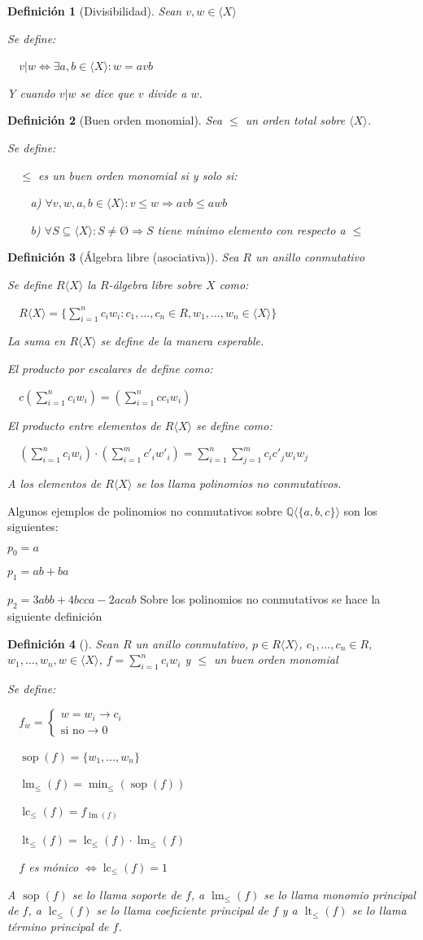 \documentclass{amsbook}
\theoremstyle{customstyle}
\newtheorem{definition}{Definición}[section]
\newcommand{\definición}[2][]{
  \begin{definition}[#1]
  \setlength{\parindent}{2em} %
  #2
  \end{definition}
}
\DeclareMathOperator{\sop}{sop}
\DeclareMathOperator{\lm}{lm}
\DeclareMathOperator{\lc}{lc}
\DeclareMathOperator{\lt}{lt}
\begin{document}
\definición[Divisibilidad] {
Sean $v, w ∈ ⟨X⟩$

Se define:

  $v | w ⇔ ∃a , b ∈ ⟨X⟩ : w = avb$

Y cuando $v | w$ se dice que $v$ divide a $w$.
}

\definición[Buen orden monomial] {
Sea $≤$ un orden total sobre $⟨X⟩$.

Se define:

  $≤$ es un buen orden monomial si y solo si:

    a) $∀v, w, a, b ∈ ⟨X⟩ : v ≤ w ⇒ avb ≤ awb$

    b) $∀S ⊆ ⟨X⟩ : S ≠ Ø ⇒ S$ tiene mínimo elemento con respecto a $≤$
}

\definición[Álgebra libre (asociativa)] {
Sea $R$ un anillo conmutativo

Se define $R⟨X⟩$ la $R$-álgebra libre sobre $X$ como:

  $R⟨X⟩ = \{\sum_{i = 1}^n c_i w_i : c_1, …, c_n ∈ R, w_1, …, w_n ∈ ⟨X⟩\}$

La suma en $R⟨X⟩$ se define de la manera esperable.

El producto por escalares de define como:

  $c (\sum_{i = 1}^n c_i w_i) = (\sum_{i = 1}^n c c_i w_i)$

El producto entre elementos de $R⟨X⟩$ se define como:

  $(\sum_{i = 1}^n c_i w_i) · (\sum_{i = 1}^m c'_i w'_i) = \sum_{i = 1}^n \sum_{j = 1}^m c_i c'_j w_i w_j$

A los elementos de $R⟨X⟩$ se los llama polinomios no conmutativos.
}

Algunos ejemplos de polinomios no conmutativos sobre $ℚ⟨\{a, b, c\}⟩$ son los siguientes:

$p_0 = a$

$p_1 = ab + ba$

$p_2 = 3 abb + 4 bcca - 2 acab$
Sobre los polinomios no conmutativos se hace la siguiente definición


\definición[] {
Sean $R$ un anillo conmutativo, $p ∈ R⟨X⟩$, $c_1, …, c_n ∈ R$, $w_1, …, w_n, w ∈ ⟨X⟩$, $f = \sum_{i = 1}^n c_i w_i$ y $≤$ un buen orden monomial

Se define:

  $f_w = \left\{\begin{array}{ll} w = w_i → c_i \\ \text{si no} → 0  \end{array} \right. $

  $\sop(f) = \{w_1, …, w_n\}$

  $\lm_≤(f) = \min_≤(\sop(f))$

  $\lc_≤(f) = f_{\lm(f)}$

  $\lt_≤(f) = \lc_≤(f) · \lm_≤(f)$

  $f$ es mónico $⇔ \lc_≤(f) = 1$

A $\sop(f)$ se lo llama soporte de $f$, a $\lm_≤(f)$ se lo llama monomio principal de $f$, a $\lc_≤(f)$ se lo llama coeficiente principal de $f$ y a $\lt_≤(f)$ se lo llama término principal de $f$.

}
\end{document}
